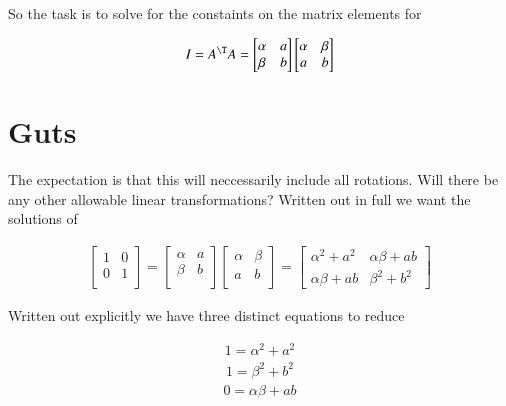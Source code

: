 So the task is to solve for the constaints on the matrix elements for

\begin{align}\label{eqn:quadratricForm:voo4}
I = A^\T A = 
\begin{bmatrix}
\alpha & a     \\
\beta  & b \\
\end{bmatrix}
\begin{bmatrix}
\alpha & \beta \\
a      & b \\
\end{bmatrix}
\end{align}

\section{Guts}

The expectation is that this will neccessarily include all rotations.  Will there be any other allowable linear transformations?  Written out in full we want the solutions of 

\begin{align}\label{eqn:quadratricForm:voo5a}
\begin{bmatrix}
1 & 0 \\
0 & 1 \\
\end{bmatrix}
=
\begin{bmatrix}
\alpha & a     \\
\beta  & b \\
\end{bmatrix}
\begin{bmatrix}
\alpha & \beta \\
a      & b \\
\end{bmatrix}
= 
\begin{bmatrix}
\alpha^2 + a^2 & \alpha \beta + a b \\
\alpha \beta + a b & \beta^2 + b^2
\end{bmatrix}
\end{align}

Written out explicitly we have three distinct equations to reduce

\begin{align}\label{eqn:quadratricForm:voo5}
1 = \alpha^2 + a^2 
\end{align}
\begin{align}\label{eqn:quadratricForm:voo6}
1 = \beta^2 + b^2 
\end{align}
\begin{align}\label{eqn:quadratricForm:voo7}
0 = \alpha \beta + a b 
\end{align}

